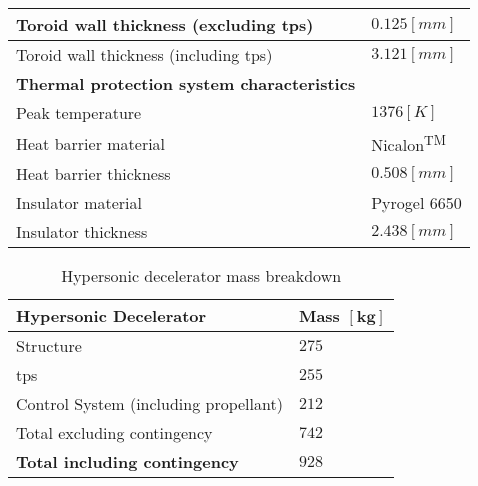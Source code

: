 \begin{table}[H]
\begin{tabular}{|p{}|p{}|}
		Toroid wall thickness (excluding \gls{tps})		&	$0.125 \left[mm\right]$		\\ \hline
		Toroid wall thickness (including \gls{tps})		&	$3.121 \left[mm\right]$		\\ \hline
		\textbf{Thermal protection system characteristics}	&		\\ \hline \hline
		Peak temperature							&	 $1376 \left[K\right]$		\\ \hline
		Heat barrier material							&	Nicalon\textsuperscript{TM}		\\ \hline
		Heat barrier thickness							&	$0.508 \left[mm\right]$		\\ \hline
		Insulator material								&	Pyrogel\textsuperscript{\textregistered} 6650		\\ \hline
		Insulator thickness								&	$2.438 \left[mm\right]$		\\ \hline
			
		
	\end{tabular}
\end{table}

\newpage

\begin{table}[H]
	\centering
	\caption{Hypersonic decelerator mass breakdown}
	\label{tab:DeceleratorMass}
	\begin{tabular}{|p{}|p{}|} \hline
		\textbf {Hypersonic Decelerator}             & \textbf{Mass $\mathbf{[kg]}$ } \\ \hline \hline
		Structure          &		 $275$       \\ \hline
		\acrlong{tps} &		  $255$      \\ \hline
		Control System (including propellant) 		   &  $212$      \\ \hline \hline
		Total excluding contingency              	   &  $742$     \\ \hline
		\textbf {Total including contingency}                 &  $928$      \\ \hline
	\end{tabular}
\end{table}

